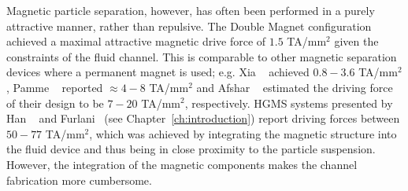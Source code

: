 
Magnetic particle separation, however, has often been performed in a purely attractive manner, rather than repulsive. The Double Magnet configuration achieved a maximal attractive magnetic drive force of $1.5$ TA/mm$^2$ given the constraints of the fluid channel. This is comparable to other magnetic separation devices where a permanent magnet is used; e.g. Xia \etal~\cite{Xia2006} achieved $0.8-3.6$ TA/mm$^2$, Pamme \etal~\cite{Pamme2006,Peyman2009a} reported $\approx 4-8$ TA/mm$^2$ and Afshar \etal~\cite{Afshar2011} estimated the driving force of their design to be $7-20$ TA/mm$^2$, respectively. HGMS systems presented by Han \etal~\cite{Han2006,Han2006a} and Furlani~\cite{Furlani2007} (see Chapter~\ref{ch:introduction}) report driving forces between $50-77$ TA/mm$^2$, which was achieved by integrating the magnetic structure into the fluid device and thus being in close proximity to the particle suspension. However, the integration of the magnetic components makes the channel fabrication more cumbersome. 



